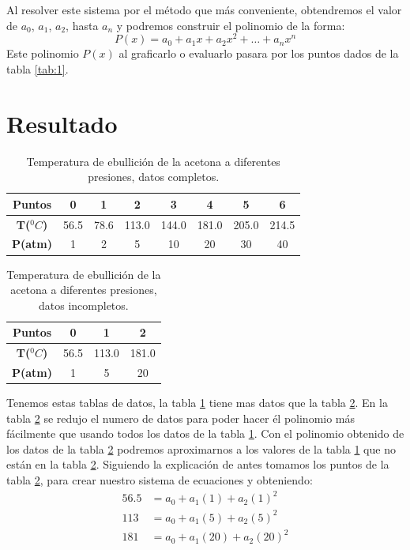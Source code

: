 \documentclass[12pt]{article}
\begin{document}
			Al resolver este sistema por el método que más conveniente, obtendremos el valor de $ a_0 $, $ a_1 $, $ a_2 $, hasta $ a_n $ y podremos 
			construir el polinomio de la forma:
			$$ P(x) = a_0 + a_1x + a_2x^2 + \dots + a_nx^{n} $$
			Este polinomio $ P(x) $ al graficarlo o evaluarlo pasara por los puntos dados de la tabla \ref{tab:1}.

		\section*{\centering Resultado}\label{sec:Resultado}
			\begin{table}[h!]
				\centering
				\begin{tabular}{|c    c    c    c    c    c    c    c|}
					\hline
					\textbf{Puntos} & 0 & 1 & 2 & 3 & 4 & 5 & 6 \\\hline
					\textbf{T($^0C$)} & 56.5 & 78.6 & 113.0 & 144.0 & 181.0 & 205.0 & 214.5 \\\hline
					\textbf{P(atm)} & 1 & 2 & 5 & 10 & 20 & 30 & 40 \\\hline								
				\end{tabular}
				\caption{Temperatura de ebullición de la acetona a diferentes presiones, datos completos. \cite{bib:item3}}
				\label{tab:2}
			\end{table}
			\begin{table}[h!]
				\centering
				\begin{tabular}{|c    c    c    c|}
					\hline
					\textbf{Puntos} & 0 & 1 & 2 \\\hline
					\textbf{T($^0C$)} & 56.5 & 113.0 & 181.0 \\\hline
					\textbf{P(atm)} & 1 & 5 & 20 \\\hline								
				\end{tabular}
				\caption{Temperatura de ebullición de la acetona a diferentes presiones, datos incompletos. \cite{bib:item3}}
				\label{tab:3}
			\end{table}
			Tenemos estas tablas de datos, la tabla \ref{tab:2} tiene mas datos que la tabla \ref{tab:3}. En la tabla \ref{tab:3} se redujo 
			el numero de datos para poder hacer él polinomio más fácilmente que usando todos los datos de la 
			tabla \ref{tab:2}. Con el polinomio obtenido de los datos de la tabla \ref{tab:3} podremos aproximarnos a los 
			valores de la tabla \ref{tab:2} que no están en la tabla \ref{tab:3}.
			Siguiendo la explicación de antes tomamos los puntos de la tabla \ref{tab:3}, para crear nuestro sistema de ecuaciones y obteniendo:
			\begin{align*}
				56.5 &= a_0 + a_1(1) + a_2(1)^2 \\
				113 &= a_0 + a_1(5) + a_2(5)^2 \\
				181 &= a_0 + a_1(20) + a_2(20)^2 
			\end{align*}
\end{document}
